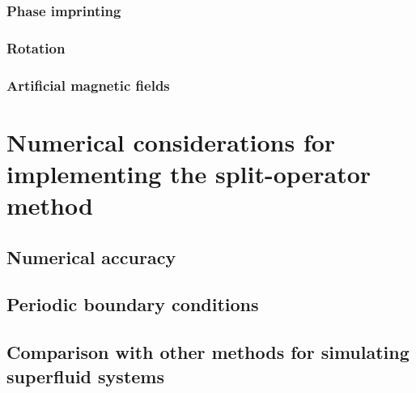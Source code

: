 \subsubsection{Phase imprinting}

\subsubsection{Rotation}

\subsubsection{Artificial magnetic fields}

\section{Numerical considerations for implementing the split-operator method}

\subsection{Numerical accuracy}

\subsection{Periodic boundary conditions}

\subsection{Comparison with other methods for simulating superfluid systems}
